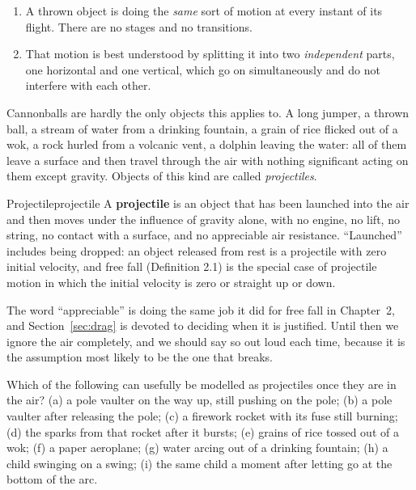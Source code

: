 \documentclass[11pt,twoside,openany]{book}
\newcounter{check}[chapter]
\begin{document}
\begin{enumerate}[itemsep=2pt]
  \item A thrown object is doing the \emph{same} sort of motion at every instant of its flight. There are no stages and no transitions.
  \item That motion is best understood by splitting it into two \emph{independent} parts, one horizontal and one vertical, which go on simultaneously and do not interfere with each other.
\end{enumerate}

Cannonballs are hardly the only objects this applies to. A long jumper, a thrown ball, a stream of water from a drinking fountain, a grain of rice flicked out of a wok, a rock hurled from a volcanic vent, a dolphin leaving the water: all of them leave a surface and then travel through the air with nothing significant acting on them except gravity. Objects of this kind are called \emph{projectiles}.

\begin{definition}{Projectile}{projectile}
A \textbf{projectile} is an object that has been launched into the air and then moves under the influence of gravity alone, with no engine, no lift, no string, no contact with a surface, and no appreciable air resistance. ``Launched'' includes being dropped: an object released from rest is a projectile with zero initial velocity, and free fall (Definition 2.1) is the special case of projectile motion in which the initial velocity is zero or straight up or down.
\end{definition}

The word ``appreciable'' is doing the same job it did for free fall in Chapter~2, and Section~\ref{sec:drag} is devoted to deciding when it is justified. Until then we ignore the air completely, and we should say so out loud each time, because it is the assumption most likely to be the one that breaks.

\begin{checkbox}
Which of the following can usefully be modelled as projectiles once they are in the air? (a) a pole vaulter on the way up, still pushing on the pole; (b) a pole vaulter after releasing the pole; (c) a firework rocket with its fuse still burning; (d) the sparks from that rocket after it bursts; (e) grains of rice tossed out of a wok; (f) a paper aeroplane; (g) water arcing out of a drinking fountain; (h) a child swinging on a swing; (i) the same child a moment after letting go at the bottom of the arc.
\end{checkbox}
\end{document}
